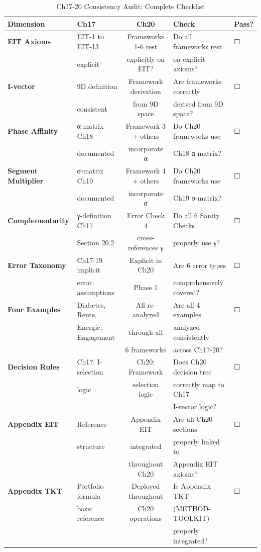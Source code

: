 \begin{table}[htbp]
\centering
\caption{Ch17-20 Consistency Audit: Complete Checklist}
\label{tab:20-final-consistency}
\renewcommand{\arraystretch}{1.2}
\footnotesize
\begin{tabular}{@{}llcll@{}}
\toprule
\textbf{Dimension} & \textbf{Ch17} & \textbf{Ch20} & \textbf{Check} & \textbf{Pass?} \\
\midrule
\textbf{EIT Axioms} & EIT-1 to EIT-13 & Frameworks 1-6 rest & Do all frameworks rest & ☐ \\
& explicit & explicitly on EIT? & on explicit axioms? & \\
\midrule
\textbf{I-vector} & 9D definition & Framework derivation & Are frameworks correctly & ☐ \\
& consistent & from 9D space & derived from 9D space? & \\
\midrule
\textbf{Phase Affinity} & α-matrix Ch18 & Framework 3 + others & Do Ch20 frameworks use & ☐ \\
& documented & incorporate α & Ch18 α-matrix? & \\
\midrule
\textbf{Segment Multiplier} & σ-matrix Ch19 & Framework 4 + others & Do Ch20 frameworks use & ☐ \\
& documented & incorporate σ & Ch19 σ-matrix? & \\
\midrule
\textbf{Complementarity} & γ-definition Ch17 & Error Check 4 & Do all 6 Sanity Checks & ☐ \\
& Section 20.2 & cross-references γ & properly use γ? & \\
\midrule
\textbf{Error Taxonomy} & Ch17-19 implicit & Explicit in Ch20 & Are 6 error types & ☐ \\
& error assumptions & Phase 1 & comprehensively covered? & \\
\midrule
\textbf{Four Examples} & Diabetes, Rente, & All re-analyzed & Are all 4 examples & ☐ \\
& Energie, Engagement & through all & analyzed consistently & \\
& & 6 frameworks & across Ch17-20? & \\
\midrule
\textbf{Decision Rules} & Ch17: I-selection & Ch20: Framework & Does Ch20 decision tree & ☐ \\
& logic & selection logic & correctly map to Ch17 & \\
& & & I-vector logic? & \\
\midrule
\textbf{Appendix EIT} & Reference & Appendix EIT & Are all Ch20 sections & ☐ \\
& structure & integrated & properly linked to & \\
& & throughout Ch20 & Appendix EIT axioms? & \\
\midrule
\textbf{Appendix TKT} & Portfolio formula & Deployed throughout & Is Appendix TKT & ☐ \\
& basic reference & Ch20 operations & (METHOD-TOOLKIT) & \\
& & & properly integrated? & \\
\bottomrule
\end{tabular}
\end{table}

